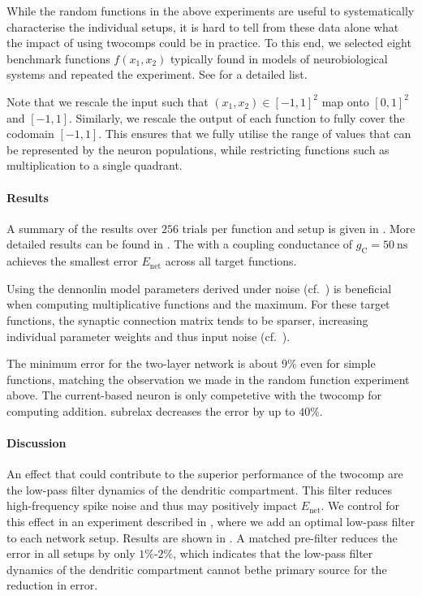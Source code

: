 While the random functions in the above experiments are useful to systematically characterise the individual setups, it is hard to tell from these data alone what the impact of using \glspl{twocomp} could be in practice.
To this end, we selected eight benchmark functions $f(x_1, x_2)$ typically found in models of neurobiological systems and repeated the experiment.
See  for a detailed list.

Note that we rescale the input such that $(x_1, x_2) \in [-1, 1]^2$ map onto $[0, 1]^2$ and $[-1, 1]$.
Similarly, we rescale the output of each function to fully cover the codomain $[-1, 1]$.
This ensures that we fully utilise the range of values that can be represented by the neuron populations, while restricting functions such as multiplication to a single quadrant.

\paragraph{Results}
A summary of the results over $256$ trials per function and setup is given in .
More detailed results can be found in .
The  with a coupling conductance of $g_\mathrm{C} = \SI{50}{\nano\second}$ achieves the smallest error $E_\mathrm{net}$ across all target functions.

Using the \gls{dennonlin} model parameters derived under noise (cf.~) is beneficial when computing multiplicative functions and the maximum.
For these target functions, the synaptic connection matrix tends to be sparser, increasing individual parameter weights and thus input noise (cf.~).

The minimum error for the two-layer network is about $9\%$ even for simple functions, matching the observation we made in the random function experiment above.
The current-based neuron is only competetive with the \gls{twocomp} for computing addition.
\Gls{subrelax} decreases the error by up to $40\%$.

\paragraph{Discussion}
An effect that could contribute to the superior performance of the \gls{twocomp} are the low-pass filter dynamics of the dendritic compartment.
This filter reduces high-frequency spike noise and thus may positively impact $E_\mathrm{net}$.
We control for this effect in an experiment described in , where we add an optimal low-pass filter to each network setup.
Results are shown in .
A matched pre-filter reduces the error in all setups by only $1\%$-$2\%$, which indicates that the low-pass filter dynamics of the dendritic compartment cannot bethe primary source for the reduction in error.


